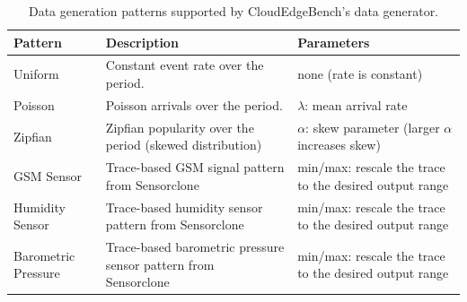 \documentclass[runningheads]{llncs}
\newcommand*{\codebox}[1]{{\ttfamily\hyphenchar\font=45\relax\hl{~#1~}}}
\begin{document}
\begin{table}
  \caption{Data generation patterns supported by CloudEdgeBench's data generator.}
  \centering
  \small
  \setlength{\tabcolsep}{4pt} %
  \renewcommand{\arraystretch}{1.15}
  \begin{tabularx}{\linewidth}{|>{\raggedright\arraybackslash}p{2.2cm}|
                               >{\raggedright\arraybackslash}X|
                               >{\raggedright\arraybackslash}p{4.0cm}|}
    \hline
    \textbf{Pattern} & \textbf{Description} & \textbf{Parameters} \\
    \hline
    Uniform
      & Constant event rate over the period.
      & none (rate is constant) \\
    \hline
    Poisson
      & Poisson arrivals over the period.
      & $\lambda$: mean arrival rate \\
    \hline
    Zipfian
      & Zipfian popularity over the period (skewed distribution)
      & $\alpha$: skew parameter (larger $\alpha$ increases skew) \\
    \hhline{|=|=|=|}
    GSM Sensor
      & Trace-based GSM signal pattern from Sensorclone~\cite{sensor-patterns}
      & min/max: rescale the trace to the desired output range \\
    \hline
    Humidity Sensor
      & Trace-based humidity sensor pattern from Sensorclone~\cite{sensor-patterns}
      & min/max: rescale the trace to the desired output range \\
    \hline
    Barometric Pressure
      & Trace-based barometric pressure sensor pattern from Sensorclone~\cite{sensor-patterns}
      & min/max: rescale the trace to the desired output range \\
    \hline
  \end{tabularx}
  \label{tab:datagen-patterns}
\end{table}

\end{document}
